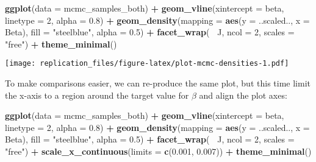 \documentclass[]{article}
\newenvironment{Shaded}{\begin{snugshade}}{\end{snugshade}}
\newcommand{\KeywordTok}[1]{\textcolor[rgb]{0.13,0.29,0.53}{\textbf{#1}}}
\newcommand{\DataTypeTok}[1]{\textcolor[rgb]{0.13,0.29,0.53}{#1}}
\newcommand{\DecValTok}[1]{\textcolor[rgb]{0.00,0.00,0.81}{#1}}
\newcommand{\FloatTok}[1]{\textcolor[rgb]{0.00,0.00,0.81}{#1}}
\newcommand{\StringTok}[1]{\textcolor[rgb]{0.31,0.60,0.02}{#1}}
\newcommand{\OperatorTok}[1]{\textcolor[rgb]{0.81,0.36,0.00}{\textbf{#1}}}
\newcommand{\NormalTok}[1]{#1}
\begin{document}
\begin{Shaded}
\begin{Highlighting}[]
\KeywordTok{ggplot}\NormalTok{(}\DataTypeTok{data =}\NormalTok{ mcmc_samples_both) }\OperatorTok{+}
\StringTok{    }\KeywordTok{geom_vline}\NormalTok{(}\DataTypeTok{xintercept =}\NormalTok{ beta,}
                \DataTypeTok{linetype =} \DecValTok{2}\NormalTok{,}
                \DataTypeTok{alpha =} \FloatTok{0.8}\NormalTok{) }\OperatorTok{+}
\StringTok{    }\KeywordTok{geom_density}\NormalTok{(}\DataTypeTok{mapping =} \KeywordTok{aes}\NormalTok{(}\DataTypeTok{y =}\NormalTok{ ..scaled.., }\DataTypeTok{x =}\NormalTok{ Beta),}
                \DataTypeTok{fill =} \StringTok{"steelblue"}\NormalTok{,}
                \DataTypeTok{alpha =} \FloatTok{0.5}\NormalTok{) }\OperatorTok{+}
\StringTok{    }\KeywordTok{facet_wrap}\NormalTok{(}\OperatorTok{~}\StringTok{ }\NormalTok{J, }\DataTypeTok{ncol =} \DecValTok{2}\NormalTok{, }\DataTypeTok{scales =} \StringTok{"free"}\NormalTok{) }\OperatorTok{+}
\StringTok{    }\KeywordTok{theme_minimal}\NormalTok{()}
\end{Highlighting}
\end{Shaded}

\texttt{[image: replication\_files/figure-latex/plot-mcmc-densities-1.pdf]}

To make comparisons easier, we can re-produce the same plot, but this
time limit the x-axis to a region around the target value for \(\beta\)
and align the plot axes:

\begin{Shaded}
\begin{Highlighting}[]
\KeywordTok{ggplot}\NormalTok{(}\DataTypeTok{data =}\NormalTok{ mcmc_samples_both) }\OperatorTok{+}
\StringTok{    }\KeywordTok{geom_vline}\NormalTok{(}\DataTypeTok{xintercept =}\NormalTok{ beta,}
                \DataTypeTok{linetype =} \DecValTok{2}\NormalTok{,}
                \DataTypeTok{alpha =} \FloatTok{0.8}\NormalTok{) }\OperatorTok{+}
\StringTok{    }\KeywordTok{geom_density}\NormalTok{(}\DataTypeTok{mapping =} \KeywordTok{aes}\NormalTok{(}\DataTypeTok{y =}\NormalTok{ ..scaled.., }\DataTypeTok{x =}\NormalTok{ Beta),}
                \DataTypeTok{fill =} \StringTok{"steelblue"}\NormalTok{,}
                \DataTypeTok{alpha =} \FloatTok{0.5}\NormalTok{) }\OperatorTok{+}
\StringTok{    }\KeywordTok{facet_wrap}\NormalTok{(}\OperatorTok{~}\StringTok{ }\NormalTok{J, }\DataTypeTok{ncol =} \DecValTok{2}\NormalTok{, }\DataTypeTok{scales =} \StringTok{"free"}\NormalTok{) }\OperatorTok{+}
\StringTok{    }\KeywordTok{scale_x_continuous}\NormalTok{(}\DataTypeTok{limits =} \KeywordTok{c}\NormalTok{(}\FloatTok{0.001}\NormalTok{, }\FloatTok{0.007}\NormalTok{)) }\OperatorTok{+}
\StringTok{    }\KeywordTok{theme_minimal}\NormalTok{()}
\end{Highlighting}
\end{Shaded}
\end{document}

